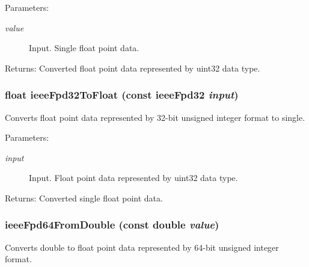 \begin{Desc}
\item[Parameters:]
\begin{description}
\item[{\em value}]Input. Single float point data.\end{description}
\end{Desc}
\begin{Desc}
\item[Returns:]Converted float point data represented by uint32 data type. \end{Desc}
\hypertarget{group__data__conv_g05dff20e60a89905d11a28ba3feb6580}{
\subsubsection[ieeeFpd32ToFloat]{\setlength{\rightskip}{0pt plus 5cm}float ieeeFpd32ToFloat (const {\bf ieeeFpd32} {\em input})}}
\label{group__data__conv_g05dff20e60a89905d11a28ba3feb6580}


Converts float point data represented by 32-bit unsigned integer format to single. 

\begin{Desc}
\item[Parameters:]
\begin{description}
\item[{\em input}]Input. Float point data represented by uint32 data type.\end{description}
\end{Desc}
\begin{Desc}
\item[Returns:]Converted single float point data. \end{Desc}
\hypertarget{group__data__conv_g004bc0d509fdc686c5a0ebcf1a0db718}{
\subsubsection[ieeeFpd64FromDouble]{ ieeeFpd64FromDouble (const double {\em value})}}
\label{group__data__conv_g004bc0d509fdc686c5a0ebcf1a0db718}


Converts double to float point data represented by 64-bit unsigned integer format. 

